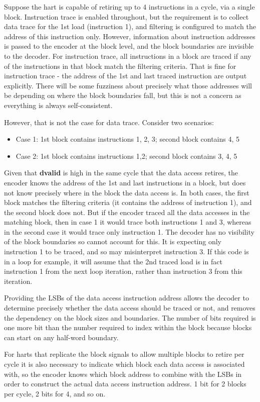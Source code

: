 Suppose the hart is capable of retiring up to 4 instructions in a cycle, via a single block.   Instruction trace is 
enabled throughout, but the requirement is to collect data trace for the 1st load (instruction 1), and filtering is
configured to match the address of this instruction only.  However, information about instruction addresses is passed 
to the encoder at the block level, and the block boundaries are invisible to the decoder.  For instruction trace, 
all instructions in a block are traced if any of the instructions in that block match the filtering criteria.  
That is fine for instruction trace - the address of the 1st and last traced instruction are output explicitly.  
There will be some fuzziness about precisely what those addresses will be depending on where the block boundaries 
fall, but this is not a concern as everything is always self-consistent.
 
However, that is not the case for data trace.  Consider two scenarios:

\begin{itemize}
  \item Case 1: 1st block contains instructions 1, 2, 3; second block contains 4, 5
  \item Case 2: 1st block contains instructions 1,2; second block contains 3, 4, 5
\end{itemize}
 
Given that \textbf{dvalid} is high in the same cycle that the data access retires, the encoder knows the address of 
the 1st and last instructions in a block, but does not know precisely where in the block the data access is.  
In both cases, the first block matches the filtering criteria (it contains the address of instruction 1), and the second block does not.  
But if the encoder traced all the data accesses in the matching block, then in case 1 it would trace both instructions 1 and 3, whereas 
in the second case it would trace only instruction 1.  The decoder has no visibility of the block boundaries so cannot account for this.
It is expecting only instruction 1 to be traced, and so may misinterpret instruction 3.  If this code is in a loop for example, it will 
assume that the 2nd traced load is in fact instruction 1 from the next loop iteration, rather than instruction 3 from this iteration.
 
Providing the LSBs of the data access instruction address allows the decoder to determine precisely whether the data access should be 
traced or not, and removes the dependency on the block sizes and boundaries.  The number of bits required is one more bit than the 
number required to index within the block because blocks can start on any half-word boundary.
 
For harts that replicate the block signals to allow multiple blocks to retire per cycle it is also necessary to indicate which block 
each data access is associated with, so the encoder knows which block address to combine with the LSBs in order to construct the 
actual data access instruction address.  1 bit for 2 blocks per cycle, 2 bits for 4, and so on.


